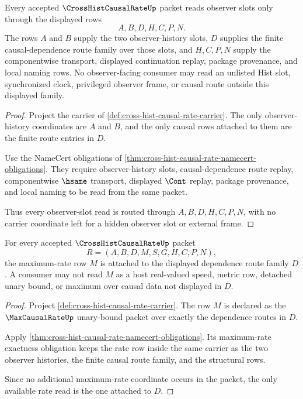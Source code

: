 \begin{theorem}
\label{thm:cross-hist-causal-rate-observer-slot-route}
Every accepted $\CrossHistCausalRateUp$ packet reads observer slots only through the displayed rows
$$
A,B,D,H,C,P,N.
$$
The rows $A$ and $B$ supply the two observer-history slots, $D$ supplies the finite causal-dependence route family over those slots, and $H,C,P,N$ supply the componentwise transport, displayed continuation replay, package provenance, and local naming rows. No observer-facing consumer may read an unlisted Hist slot, synchronized clock, privileged observer frame, or causal route outside this displayed family.
\end{theorem}
\begin{proof}
Project the carrier of \autoref{def:cross-hist-causal-rate-carrier}. The only observer-history coordinates are $A$ and $B$, and the only causal rows attached to them are the finite route entries in $D$.

Use the NameCert obligations of \autoref{thm:cross-hist-causal-rate-namecert-obligations}. They require observer-history slots, causal-dependence route replay, componentwise $\hsame$ transport, displayed $\Cont$ replay, package provenance, and local naming to be read from the same packet.

Thus every observer-slot read is routed through $A,B,D,H,C,P,N$, with no carrier coordinate left for a hidden observer slot or external frame.
\end{proof}

\begin{theorem}
\label{thm:cross-hist-causal-rate-max-row-exactness}
For every accepted $\CrossHistCausalRateUp$ packet
$$
R=(A,B,D,M,S,G,H,C,P,N),
$$
the maximum-rate row $M$ is attached to the displayed dependence route family $D$. A consumer may not read $M$ as a host real-valued speed, metric row, detached unary bound, or maximum over causal data not displayed in $D$.
\end{theorem}
\begin{proof}
Project \autoref{def:cross-hist-causal-rate-carrier}. The row $M$ is declared as the $\MaxCausalRateUp$ unary-bound packet over exactly the dependence routes in $D$.

Apply \autoref{thm:cross-hist-causal-rate-namecert-obligations}. Its maximum-rate exactness obligation keeps the rate row inside the same carrier as the two observer histories, the finite causal route family, and the structural rows.

Since no additional maximum-rate coordinate occurs in the packet, the only available rate read is the one attached to $D$.
\end{proof}

